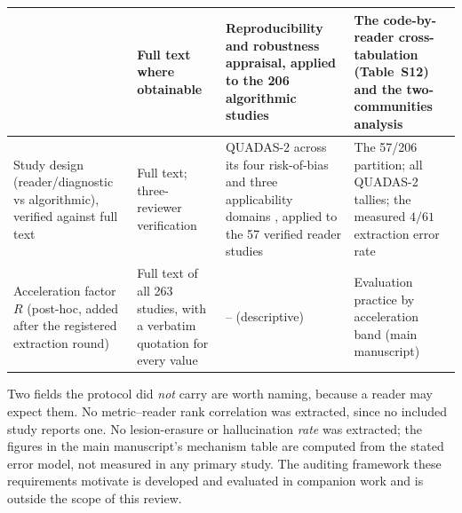\documentclass[11pt]{article}
\begin{document}
\begin{table}[t]
\begin{tabular}{p{} p{} p{} p{}}
& Full text where obtainable
& Reproducibility and robustness appraisal, applied to the 206 algorithmic studies
& The code-by-reader cross-tabulation (Table~S12) and the two-communities analysis \\
\hline
Study design (reader/diagnostic vs algorithmic), verified against full text
& Full text; three-reviewer verification
& QUADAS-2 across its four risk-of-bias and three applicability domains
\cite{whiting2011quadas}, applied to the 57 verified reader studies
& The 57/206 partition; all QUADAS-2 tallies; the measured $4/61$ extraction error rate \\
\hline
Acceleration factor $R$ (post-hoc, added after the registered extraction round)
& Full text of all 263 studies, with a verbatim quotation for every value
& -- (descriptive)
& Evaluation practice by acceleration band (main manuscript) \\
\hline
\end{tabular}

\vspace{2pt}
{\footnotesize Two fields the protocol did \emph{not} carry are worth naming, because a
reader may expect them. No metric--reader rank correlation was extracted, since no included
study reports one. No lesion-erasure or hallucination \emph{rate} was extracted; the figures
in the main manuscript's mechanism table are computed from the stated error model, not
measured in any primary study. The auditing framework these requirements motivate is
developed and evaluated in companion work and is outside the scope of this review.}
\end{table}
\end{document}

